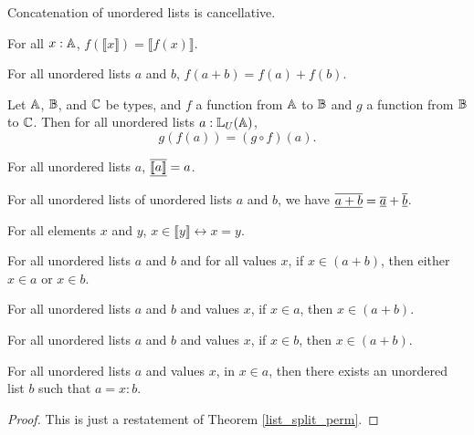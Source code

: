 \documentclass[../../math.tex]{subfiles}
\begin{document}
\begin{instance}
    Concatenation of unordered lists is cancellative.
\end{instance}

\begin{theorem}
    For all $x : \mathbb{A}$, $f(\llbracket x\rrbracket) = \llbracket f(x)\rrbracket$.
\end{theorem}

\begin{theorem}
    For all unordered lists $a$ and $b$, $f(a + b) = f(a) + f(b)$.
\end{theorem}

\begin{theorem}
    Let $\mathbb{A}$, $\mathbb{B}$, and $\mathbb{C}$ be types, and $f$ a function from $\mathbb{A}$ to $\mathbb{B}$ and
    $g$ a function from $\mathbb{B}$ to $\mathbb{C}$.  Then for all unordered lists $a :
    \mathbb{L}_U(\mathbb{A})$,
    \[
        g(f(a)) = (g \circ f)(a).
    \]
\end{theorem}

\begin{theorem}
    For all unordered lists $a$, $\underline{\overline{\llbracket a\rrbracket}} = a$.
\end{theorem}

\begin{theorem}
    For all unordered lists of unordered lists $a$ and $b$, we have $\underline{\overline{a
    + b}} = \underline{\overline{a}} + \underline{\overline{b}}$.
\end{theorem}

\begin{theorem}
    For all elements $x$ and $y$, $x \in \llbracket y\rrbracket \leftrightarrow
    x = y$.
\end{theorem}

\begin{theorem} \label{in_ulist_conc}
    For all unordered lists $a$ and $b$ and for all values $x$, if $x \in (a +
    b)$, then either $x \in a$ or $x \in b$.
\end{theorem}

\begin{theorem} \label{in_ulist_lconc}
    For all unordered lists $a$ and $b$ and values $x$, if $x \in a$, then $x
    \in (a + b)$.
\end{theorem}

\begin{theorem} \label{in_ulist_rconc}
    For all unordered lists $a$ and $b$ and values $x$, if $x \in b$, then $x
    \in (a + b)$.
\end{theorem}

\begin{theorem} \label{in_ulist_split}
    For all unordered lists $a$ and values $x$, in $x \in a$, then there exists
    an unordered list $b$ such that $a = x : b$.
\end{theorem}
\begin{proof}
    This is just a restatement of Theorem \ref{list_split_perm}.
\end{proof}
\end{document}
